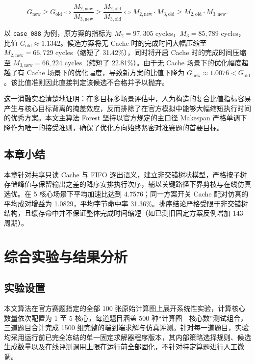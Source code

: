 \documentclass[anonymous,withtoc]{gmcm2026}
\begin{document}
\begin{equation}
G_{\mathrm{new}} \ge G_{\mathrm{old}} \iff \frac{M_{2, \mathrm{new}}}{M_{3, \mathrm{new}}} \ge \frac{M_{2, \mathrm{old}}}{M_{3, \mathrm{old}}} \iff M_{2, \mathrm{new}} \cdot M_{3, \mathrm{old}} \ge M_{2, \mathrm{old}} \cdot M_{3, \mathrm{new}}.
\end{equation}

以 \texttt{case\_088} 为例，原方案的指标为 \(M_2 = 97{,}305\) cycles，\(M_3 = 85{,}789\) cycles，比值 \(G_{\mathrm{old}} \approx 1.1342\)。候选方案将无 Cache 时的完成时间大幅压缩至 \(M_{2, \mathrm{new}} = 66{,}729\) cycles（缩短了 31.42\%），同时将开启 Cache 时的完成时间压缩至 \(M_{3, \mathrm{new}} = 66{,}224\) cycles（缩短了 22.81\%）。由于无 Cache 场景下的优化幅度超越了有 Cache 场景下的优化幅度，导致新方案的比值下降为 \(G_{\mathrm{new}} \approx 1.0076 < G_{\mathrm{old}}\)。该比值准则因此直接判定该候选不合格并予以抛弃。

这一消融实验清楚地证明：在多目标多场景评估中，人为构造的复合比值指标容易产生与核心目标背离的掩盖效应，反而排除了在官方模拟中能够大幅缩短执行时间的优秀方案。本文主算法 Forest 坚持以官方规定的主口径 Makespan 严格单调下降作为唯一的接受准则，确保了优化方向始终紧密对准赛题的首要目标。

\subsection{本章小结}

本章针对共享只读 Cache 与 FIFO 逐出语义，建立非交错树状模型，严格按子树存储峰值与保留输出之差的降序安排执行次序，辅以关键路径下界剪枝与在线仿真选优。在 5 核心场景下平均加速比达到 4.7576；同一方案开关 Cache 配对仿真的平均成对增益为 1.0829，平均字节命中率 31.36\%。排序结论严格受限于非交错树结构，且缓存命中并不保证整体完成时间缩短（如已测旧固定方案反例增加 143 周期）。


\section{综合实验与结果分析}

\subsection{实验设置}

本文算法在官方赛题指定的全部 100 张原始计算图上展开系统性实验，计算核心数量依次配置为 1 至 5 核心，每道题目涵盖 500 种``计算图---核心数''测试组合，三道题目合计完成 1500 组完整的端到端求解与仿真评测。针对每一道题目，实验均采用运行前已完全冻结的单一固定求解器程序版本，其内部策略选择规则、候选生成数量以及在线评测调用上限在运行前全部固化，不针对特定算题进行人工微调。
\end{document}

